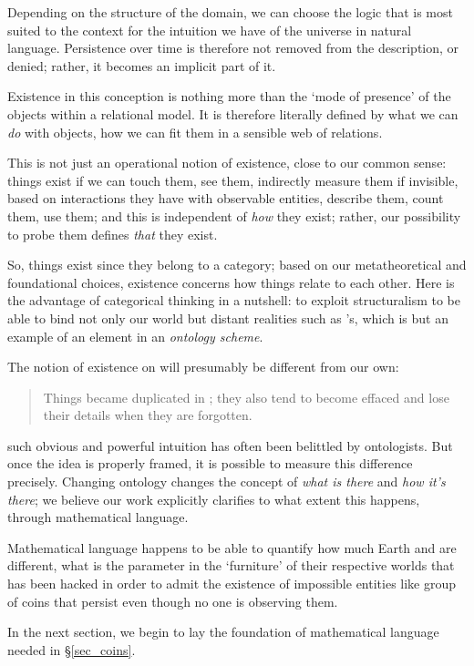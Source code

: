Depending on the structure of the domain, we can choose the logic that is most suited to the context for the intuition we have of the universe in natural language. Persistence over time is therefore not removed from the description, or denied; rather, it becomes an implicit part of it.

Existence in this conception is nothing more than the `mode of presence' of the objects within a relational model. It is therefore literally defined by what we can \emph{do} with objects, how we can fit them in a sensible web of relations.

This is not just an operational notion of existence, close to our common sense: things exist if we can touch them, see them, indirectly measure them if invisible, based on interactions they have with observable entities, describe them, count them, use them; and this is independent of \emph{how} they exist; rather, our possibility to probe them defines \emph{that} they exist.

So, things exist since they belong to a category; based on our metatheoretical and foundational choices, existence concerns how things relate to each other. Here is the advantage of categorical thinking in a nutshell: to exploit structuralism to be able to bind not only our world but distant realities such as \tlon's, which is but an example of an element in an \emph{ontology scheme}.

The notion of existence on \tlon will presumably be different from our own:
\begin{quote}
    Things became duplicated in \tlon; they also tend to become effaced and lose their details when they are forgotten. \hfill\cite{Borges1963}
\end{quote}
such obvious and powerful intuition has often been belittled by ontologists. But once the idea is properly framed, it is possible to measure this difference precisely. Changing ontology changes the concept of \emph{what is there} and \emph{how it's there}; we believe our work explicitly clarifies to what extent this happens, through mathematical language.

Mathematical language happens to be able to quantify how much Earth and \tlon are different, what is the parameter in the `furniture' of their respective worlds that has been hacked in order to admit the existence of impossible entities like group of coins that persist even though no one is observing them.

In the next section, we begin to lay the foundation of mathematical language needed in §\ref{sec_coins}.